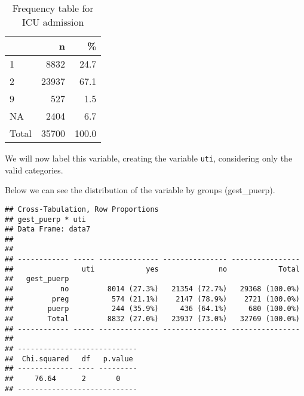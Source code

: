 \documentclass[
]{article}
\newenvironment{Shaded}{\begin{snugshade}}{\end{snugshade}}
\newcommand{\DataTypeTok}[1]{\textcolor[rgb]{0.13,0.29,0.53}{#1}}
\newcommand{\KeywordTok}[1]{\textcolor[rgb]{0.13,0.29,0.53}{\textbf{#1}}}
\newcommand{\NormalTok}[1]{#1}
\newcommand{\OperatorTok}[1]{\textcolor[rgb]{0.81,0.36,0.00}{\textbf{#1}}}
\newcommand{\OtherTok}[1]{\textcolor[rgb]{0.56,0.35,0.01}{#1}}
\newcommand{\StringTok}[1]{\textcolor[rgb]{0.31,0.60,0.02}{#1}}
\begin{document}
\begin{table}[!h]

\caption{\label{tab:unnamed-chunk-177}Frequency table for ICU admission}
\centering
\begin{tabular}[t]{l|r|r}
\hline
  & n & \%\\
\hline
1 & 8832 & 24.7\\
\hline
2 & 23937 & 67.1\\
\hline
9 & 527 & 1.5\\
\hline
NA & 2404 & 6.7\\
\hline
Total & 35700 & 100.0\\
\hline
\end{tabular}
\end{table}

We will now label this variable, creating the variable \texttt{uti},
considering only the valid categories.

\begin{Shaded}
\end{Shaded}

Below we can see the distribution of the variable by groups
(gest\_puerp).

\begin{Shaded}
\end{Shaded}

\begin{verbatim}
## Cross-Tabulation, Row Proportions  
## gest_puerp * uti  
## Data Frame: data7  
## 
## 
## ------------ ----- -------------- --------------- ----------------
##                uti            yes              no            Total
##   gest_puerp                                                      
##           no         8014 (27.3%)   21354 (72.7%)   29368 (100.0%)
##         preg          574 (21.1%)    2147 (78.9%)    2721 (100.0%)
##        puerp          244 (35.9%)     436 (64.1%)     680 (100.0%)
##        Total         8832 (27.0%)   23937 (73.0%)   32769 (100.0%)
## ------------ ----- -------------- --------------- ----------------
## 
## ----------------------------
##  Chi.squared   df   p.value 
## ------------- ---- ---------
##     76.64      2       0    
## ----------------------------
\end{verbatim}
\end{document}

